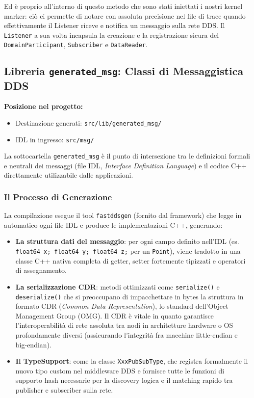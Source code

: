 Ed è proprio all'interno di questo metodo che sono stati iniettati i nostri kernel marker: ciò ci permette di notare con assoluta precisione nel file di trace quando effettivamente il Listener riceve e notifica un messaggio sulla rete DDS. Il \texttt{Listener} a sua volta incapsula la creazione e la registrazione sicura del \texttt{DomainParticipant}, \texttt{Subscriber} e \texttt{DataReader}.



\subsection{Libreria \texttt{generated\_msg}: Classi di Messaggistica DDS}
\label{sec:lib_generated_msg}

\noindent\textbf{Posizione nel progetto:}
\begin{itemize}
	\item Destinazione generati: \texttt{src/lib/generated\_msg/}
	\item IDL in ingresso: \texttt{src/msg/}
\end{itemize}

La sottocartella \texttt{generated\_msg} è il punto di intersezione tra le definizioni formali e neutrali dei messaggi (file IDL, \textit{Interface Definition Language}) e il codice C++ direttamente utilizzabile dalle applicazioni.

\subsubsection{Il Processo di Generazione}

La compilazione esegue il tool \texttt{fastddsgen} (fornito dal framework) che legge in automatico ogni file IDL e produce le implementazioni C++, generando:
\begin{itemize}
	\item \textbf{La struttura dati del messaggio}: per ogni campo definito nell'IDL (es. \texttt{float64 x; float64 y; float64 z;} per un \texttt{Point}), viene tradotto in una classe C++ nativa completa di getter, setter fortemente tipizzati e operatori di assegnamento.
	\item \textbf{La serializzazione CDR}: metodi ottimizzati come \texttt{serialize()} e \texttt{deserialize()} che si preoccupano di impacchettare in bytes la struttura in formato CDR (\textit{Common Data Representation}), lo standard dell'Object Management Group (OMG). Il CDR è vitale in quanto garantisce l'interoperabilità di rete assoluta tra nodi in architetture hardware o OS profondamente diversi (assicurando l'integrità fra macchine little-endian e big-endian).
	\item \textbf{Il TypeSupport}: come la classe \texttt{XxxPubSubType}, che registra formalmente il nuovo tipo custom nel middleware DDS e fornisce tutte le funzioni di supporto hash necessarie per la discovery logica e il matching rapido tra publisher e subscriber sulla rete.
\end{itemize}

